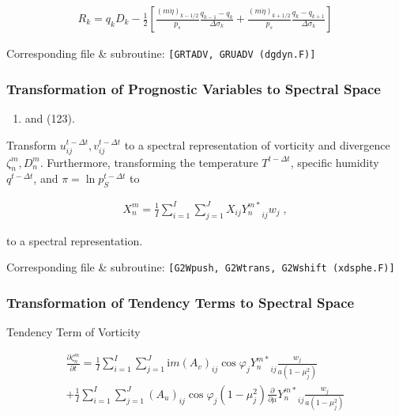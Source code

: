 \begin{eqnarray}
R_k  =  q_k D_k
       - \frac{1}{2}
             \left[   \frac{(m\dot{\eta})_{k-1/2}}{p_s} \frac{q_{k-1} - q_k}{\Delta\sigma_k}
               + \frac{(m\dot{\eta})_{k+1/2}}{p_s} \frac{q_k   - q_{k+1}}{\Delta\sigma_k} \right]
\end{eqnarray}

Corresponding file \& subroutine:
\texttt{{[}GRTADV,\ GRUADV\ (dgdyn.F){]}}

\hypertarget{transformation-of-prognostic-variables-to-spectral-space}{%
\subsubsection{Transformation of Prognostic Variables to Spectral
Space}\label{transformation-of-prognostic-variables-to-spectral-space}}

\begin{enumerate}
\def\labelenumi{(\arabic{enumi})}
\setcounter{enumi}{121}
\tightlist
\item
  and (123).
\end{enumerate}

Transform \(u_{ij}^{t-\Delta t}, v_{ij}^{t-\Delta t}\) to a spectral
representation of vorticity and divergence \(\zeta_n^m, D_n^m\).
Furthermore, transforming the temperature \(T^{t-\Delta t}\), specific
humidity \(q^{t-\Delta t}\), and \(\pi = \ln p_S^{t-\Delta t}\) to

\begin{eqnarray}
  X_n^m  =  \frac{1}{I} \sum_{i=1}^{I} \sum_{j=1}^{J}  
               X_{ij} {Y_n^{m *}}_{ij}  w_j \; ,
\end{eqnarray}

to a spectral representation.

Corresponding file \& subroutine:
\texttt{{[}G2Wpush,\ G2Wtrans,\ G2Wshift\ (xdsphe.F){]}}

\hypertarget{transformation-of-tendency-terms-to-spectral-space}{%
\subsubsection{Transformation of Tendency Terms to Spectral
Space}\label{transformation-of-tendency-terms-to-spectral-space}}

Tendency Term of Vorticity

\begin{eqnarray}
  \frac{\partial{\zeta_n^m}}{\partial {t}}
    =  \frac{1}{I} \sum_{i=1}^{I} \sum_{j=1}^{J}  
    \mathrm{i}m (A_v)_{ij} \cos \varphi_j
    {Y_n^{m *}}_{ij}
    \frac{w_j}{a(1-\mu_j^{2})}
\\
  +\frac{1}{I} \sum_{i=1}^{I} \sum_{j=1}^{J}  
    (A_u)_{ij} \cos \varphi_j
    (1-\mu_j^2)
    \frac{\partial }{\partial \mu} {Y_n^{m *}}_{ij}
    \frac{w_j}{a(1-\mu_j^{2})}
\end{eqnarray}

